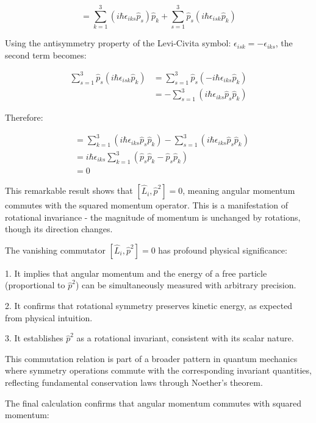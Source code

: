 \documentclass[10pt]{article}
\begin{document}
\begin{equation*}
[\hat{L}_i, \hat{p}^2] = \sum_{k=1}^{3}(i\hbar\epsilon_{iks}\hat{p}_s)\hat{p}_k + \sum_{s=1}^{3}\hat{p}_s(i\hbar\epsilon_{isk}\hat{p}_k) \tag{1.72}
\end{equation*}

Using the antisymmetry property of the Levi-Civita symbol: $\epsilon_{isk} = -\epsilon_{iks}$, the second term becomes:

\begin{align*}
\sum_{s=1}^{3}\hat{p}_s(i\hbar\epsilon_{isk}\hat{p}_k) &= \sum_{s=1}^{3}\hat{p}_s(-i\hbar\epsilon_{iks}\hat{p}_k) \\
&= -\sum_{s=1}^{3}(i\hbar\epsilon_{iks}\hat{p}_s\hat{p}_k)
\end{align*}

Therefore:

\begin{align*}
[\hat{L}_i, \hat{p}^2] &= \sum_{k=1}^{3}(i\hbar\epsilon_{iks}\hat{p}_s\hat{p}_k) - \sum_{s=1}^{3}(i\hbar\epsilon_{iks}\hat{p}_s\hat{p}_k) \\
&= i\hbar\epsilon_{iks}\sum_{k=1}^{3}(\hat{p}_s\hat{p}_k - \hat{p}_s\hat{p}_k) \\
&= 0
\end{align*}

This remarkable result shows that $[\hat{L}_i, \hat{p}^2] = 0$, meaning angular momentum commutes with the squared momentum operator. This is a manifestation of rotational invariance - the magnitude of momentum is unchanged by rotations, though its direction changes.

The vanishing commutator $[\hat{L}_i, \hat{p}^2] = 0$ has profound physical significance:

1. It implies that angular momentum and the energy of a free particle (proportional to $\hat{p}^2$) can be simultaneously measured with arbitrary precision.

2. It confirms that rotational symmetry preserves kinetic energy, as expected from physical intuition.

3. It establishes $\hat{p}^2$ as a rotational invariant, consistent with its scalar nature.

This commutation relation is part of a broader pattern in quantum mechanics where symmetry operations commute with the corresponding invariant quantities, reflecting fundamental conservation laws through Noether's theorem.


The final calculation confirms that angular momentum commutes with squared momentum:
\end{document}
